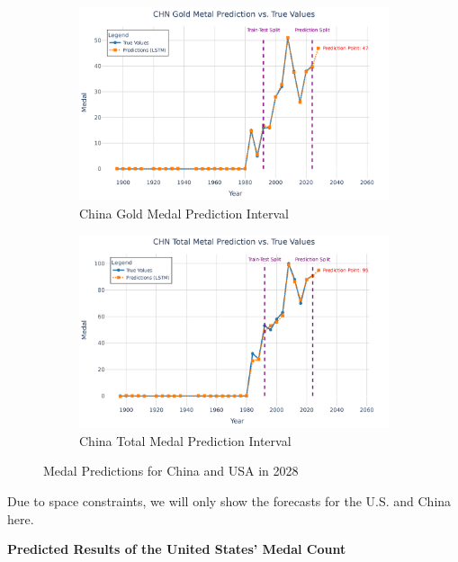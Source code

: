 \documentclass{mcmthesis}
\begin{document}
\begin{figure}[H]
	\begin{subfigure}[b]{0.48\textwidth}
		\includegraphics[width=\textwidth]{fig/CHN Gold Metal Prediction vs. True Values.png}
		\caption{China Gold Medal Prediction Interval}
		\label{fig:chn_gold1}
	\end{subfigure}
	\hfill
	\begin{subfigure}[b]{0.48\textwidth}
		\includegraphics[width=\textwidth]{fig/CHN Total Metal Prediction vs. True Values.png}
		\caption{China Total Medal Prediction Interval}
		\label{fig:chn_total1}
	\end{subfigure}
	
	\caption{Medal Predictions for China and USA in 2028}
	\label{all}
\end{figure}

Due to space constraints, we will only show the forecasts for the U.S. and China here.


\textbf{Predicted Results of the United States’ Medal Count}
\end{document}
